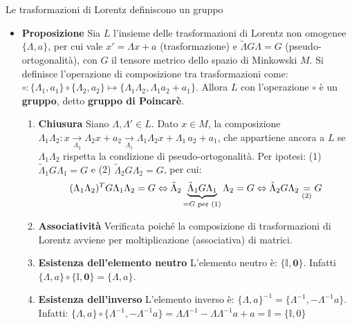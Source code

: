 \documentclass[a4_2,grid,frame]{flashcards}
\newenvironment{cartaflash}
    {\vspace{-15pt}
    \begin{itemize}
    }
    {
    \end{itemize}
    }
\begin{document}
\begin{flashcard}[Dimostrazione]{Le trasformazioni di Lorentz definiscono un gruppo}
\begin{cartaflash}
\item \textbf{Proposizione} Sia $L$ l'insieme delle trasformazioni di Lorentz non omogenee $\{\Lambda, a\}$, per cui vale $x' = \Lambda x + a$ (trasformazione) e $\tilde{\Lambda} G \Lambda = G$ (pseudo-ortogonalità), con $G$ il tensore metrico dello spazio di Minkowski $M$. Si definisce l'operazione di composizione tra trasformazioni come: $\circ: \{\Lambda_1, a_1\}\circ \{\Lambda_2, a_2\} \mapsto \{\Lambda_1\Lambda_2, \Lambda_1 a_2 + a_1\}$. Allora $L$ con l'operazione $\circ$ è un \textbf{gruppo}, detto \textbf{gruppo di Poincarè}.
\vspace{-4pt}
\begin{enumerate}
    \item \textbf{Chiusura} Siano $\Lambda, \Lambda' \in L$. Dato $x \in M$, la composizione $\Lambda_1\Lambda_2: x \xrightarrow[\Lambda_2]{} \Lambda_2 x + a_2 \xrightarrow[\Lambda_1]{} \Lambda_1\Lambda_2 x + \Lambda_1\,a_2 + a_1$, che appartiene ancora a $L$ se $\Lambda_1\Lambda_2$ rispetta la condizione di pseudo-ortogonalità. Per ipotesi: (1) $\tilde{\Lambda}_1 G \Lambda_1 = G$ e  (2) $\tilde{\Lambda}_2 G \Lambda_2 = G$, per cui:
    \vspace{-7pt}
    \[
    (\Lambda_1 \Lambda_2)^T G \Lambda_1 \Lambda_2 = G \Leftrightarrow \tilde{\Lambda}_2\underbrace{\tilde{\Lambda}_1G\Lambda_1}_{=G\text{ per (1)}}\Lambda_2 = G \Leftrightarrow \tilde{\Lambda}_2 G \Lambda_2 \underset{\mathrm{(2)}}{=} G 
    \vspace{-13pt}
    \]
    \item \textbf{Associatività} Verificata poiché la composizione di trasformazioni di Lorentz avviene per moltiplicazione (associativa) di matrici.
    \item \textbf{Esistenza dell'elemento neutro} L'elemento neutro è: $\{\mathbb{I}, \bm{0}\}$. Infatti $\{\Lambda,a\} \circ \{\mathbb{I}, \bm{0}\} = \{\Lambda, a\}$.
    \item \textbf{Esistenza dell'inverso} L'elemento inverso è: $\{\Lambda, a\}^{-1} = \{ \Lambda^{-1}, -\Lambda^{-1}a\}$. Infatti: $\{\Lambda, a\} \circ \{\Lambda^{-1}, -\Lambda^{-1}a\} = \Lambda\Lambda^{-1} - \Lambda\Lambda^{-1}a + a = \mathbb{I} = \{\mathbb{I}, 0\}$
\end{enumerate}
\end{cartaflash}
\end{flashcard}
\end{document}

